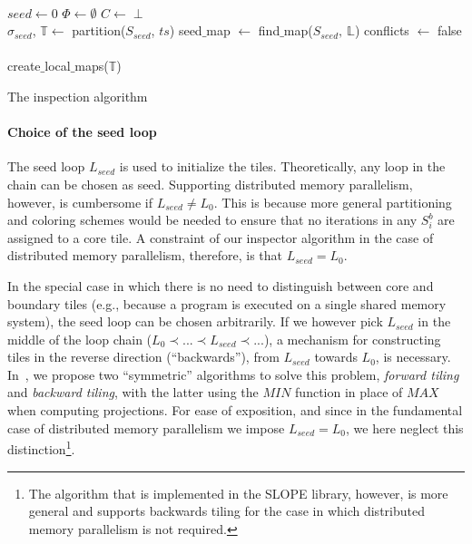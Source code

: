 \setcounter{algocf}{0}%
\begin{algorithm}[t]
\nonl ~\\
$seed \gets 0$\;
$\Phi \gets \emptyset$\;
$C \gets \perp$\;
\nonl ~\\
$\sigma_{seed}$, $\mathbb{T} \gets$ partition($S_{seed}$, $ts$)\;
seed$\_$map $\gets$ find$\_$map($S_{seed},\ \mathbb{L}$)\;
conflicts $\gets$ false\;
\nonl ~\\
create$\_$local$\_$maps($\mathbb{T}$)\;
\caption{The inspection algorithm}
\label{algo:st-inspector}
\end{algorithm}




\paragraph{Choice of the seed loop}
The seed loop $L_{seed}$ is used to initialize the tiles. Theoretically, any loop in the chain can be chosen as seed. Supporting distributed memory parallelism, however, is cumbersome if $L_{seed} \neq L_0$. This is because more general partitioning and coloring schemes would be needed to ensure that no iterations in any $S_i^{b}$ are assigned to a core tile. A constraint of our inspector algorithm in the case of distributed memory parallelism, therefore, is that $L_{seed} = L_0$. 

In the special case in which there is no need to distinguish between core and boundary tiles (e.g., because a program is executed on a single shared memory system), the seed loop can be chosen arbitrarily. If we however pick $L_{seed}$ in the middle of the loop chain ($L_0 \prec ... \prec L_{seed} \prec ...$), a mechanism for constructing tiles in the reverse direction (``backwards''), from $L_{seed}$ towards $L_0$, is necessary. In~\cite{st-paper}, we propose two ``symmetric'' algorithms to solve this problem, \textit{forward tiling} and \textit{backward tiling}, with the latter using the $MIN$ function in place of $MAX$ when computing projections. For ease of exposition, and since in the fundamental case of distributed memory parallelism we impose $L_{seed} = L_0$, we here neglect this distinction\footnote{The algorithm that is implemented in the SLOPE library, however, is more general and supports backwards tiling for the case in which distributed memory parallelism is not required.}. 

